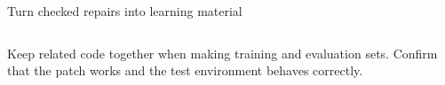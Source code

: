 \begin{frame}{Turn checked repairs into learning material}
\vspace{2mm}

\vspace{4mm}
\begin{columns}[T,onlytextwidth]
\small Keep related code together when making training and evaluation sets.
\small Confirm that the patch works and the test environment behaves correctly.
\end{columns}

\end{frame}

